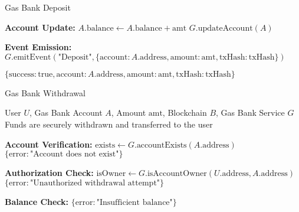 \begin{tcolorbox}
\begin{tcolorbox}
\begin{protocol}{Gas Bank Deposit}
\begin{algorithmic}[1]
\State \textbf{Account Update:}
\State $A.\text{balance} \gets A.\text{balance} + \text{amt}$
\State $G.\text{updateAccount}(A)$

\State \textbf{Event Emission:}
\State $G.\text{emitEvent}(\text{"Deposit"}, \{\text{account}: A.\text{address}, \text{amount}: \text{amt}, \text{txHash}: \text{txHash}\})$

\State \Return $\{\text{success}: \text{true}, \text{account}: A.\text{address}, \text{amount}: \text{amt}, \text{txHash}: \text{txHash}\}$
\end{algorithmic}
\end{protocol}
\end{tcolorbox}


\begin{tcolorbox}[
    enhanced,
    colback=blue!5!white,
    colframe=blue!75!black,
    arc=5mm,
    boxrule=1.5pt,
    title=Gas Bank Protocol,
    fonttitle=\bfseries,
    coltitle=white,
    attach boxed title to top left={yshift=-2mm, xshift=5mm},
    boxed title style={colback=blue!75!black, rounded corners},
    shadow={2mm}{-2mm}{0mm}{black!50},
    drop fuzzy shadow
]
\begin{tcolorbox}[
    enhanced,
    colback=blue!5!white,
    colframe=blue!75!black,
    arc=5mm,
    boxrule=1.5pt,
    title=Protocol,
    fonttitle=\bfseries,
    coltitle=white,
    attach boxed title to top left={yshift=-2mm, xshift=5mm},
    boxed title style={colback=blue!75!black, rounded corners},
    shadow={2mm}{-2mm}{0mm}{black!50},
    drop fuzzy shadow
]
\begin{protocol}{Gas Bank Withdrawal}
\label{prot:gas-bank-withdrawal}
\begin{algorithmic}[1]
\Require User $U$, Gas Bank Account $A$, Amount $\text{amt}$, Blockchain $B$, Gas Bank Service $G$
\Ensure Funds are securely withdrawn and transferred to the user

\State \textbf{Account Verification:}
\State $\text{exists} \gets G.\text{accountExists}(A.\text{address})$
    \State \Return $\{\text{error}: \text{"Account does not exist"}\}$
\EndIf

\State \textbf{Authorization Check:}
\State $\text{isOwner} \gets G.\text{isAccountOwner}(U.\text{address}, A.\text{address})$
    \State \Return $\{\text{error}: \text{"Unauthorized withdrawal attempt"}\}$
\EndIf

\State \textbf{Balance Check:}
    \State \Return $\{\text{error}: \text{"Insufficient balance"}\}$
\EndIf


\end{algorithmic}
\end{protocol}
\end{tcolorbox}
\end{tcolorbox}
\end{tcolorbox}
